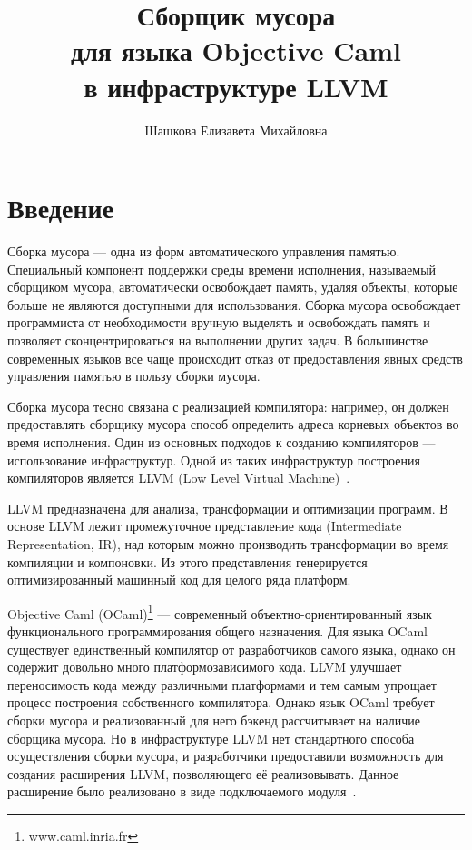 \title{Сборщик мусора\\
для языка Objective Caml\\
в инфраструктуре LLVM}
%
\author{Шашкова Елизавета Михайловна}
%
%
%

\maketitle              %

\section*{Введение}

Сборка мусора --- одна из форм автоматического управления памятью. Специальный компонент поддержки среды времени исполнения, 
называемый сборщиком мусора, автоматически освобождает 
память, удаляя объекты, которые больше не являются доступными для использования.  Сборка мусора освобождает программиста от 
необходимости вручную выделять и освобождать память и позволяет сконцентрироваться на выполнении других задач.
В большинстве современных языков все чаще происходит отказ от предоставления явных средств управления памятью в пользу сборки мусора.

Сборка мусора тесно связана с реализацией компилятора: например, он должен предоставлять сборщику мусора способ определить адреса корневых объектов во
время исполнения. Один из основных
подходов к созданию компиляторов --- использование инфраструктур. Одной из таких инфраструктур построения компиляторов является LLVM 
(Low Level Virtual Machine)~\cite{llvm}. 

LLVM предназначена 
для анализа, трансформации и оптимизации программ. В основе LLVM лежит промежуточное представление кода 
(Intermediate Representation, IR), над которым можно производить трансформации во время компиляции и компоновки. 
Из этого представления генерируется оптимизированный машинный код для целого ряда платформ.

Objective Caml (OCaml)\footnote{www.caml.inria.fr} --- современный объектно-ориентированный язык функционального программирования общего назначения.
Для языка OCaml существует единственный компилятор от разработчиков самого языка, однако он содержит довольно много платформозависимого кода.
LLVM улучшает переносимость кода между различными платформами и тем самым упрощает процесс построения 
собственного компилятора. Однако язык OCaml требует сборки мусора и реализованный для него бэкенд рассчитывает на наличие сборщика мусора. Но в 
инфраструктуре LLVM нет стандартного способа осуществления сборки мусора, и разработчики предоставили 
возможность для создания расширения LLVM, позволяющего её реализовывать. Данное расширение было реализовано в виде подключаемого модуля~\cite{samofal}.

